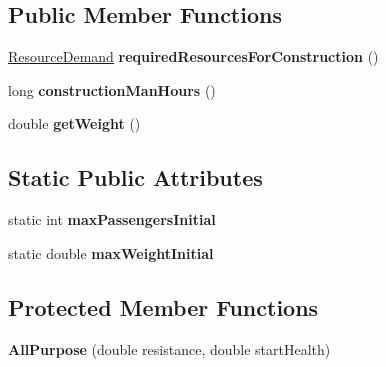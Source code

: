 \subsection*{Public Member Functions}
\begin{DoxyCompactItemize}
\item 
\hyperlink{classuniverse_1_1_resource_demand}{Resource\+Demand} {\bfseries required\+Resources\+For\+Construction} ()\hypertarget{classtools_1_1vehicles_1_1roadgoing_1_1_all_purpose_a8692e475ec5050e1d204a9bb73af242a}{}\label{classtools_1_1vehicles_1_1roadgoing_1_1_all_purpose_a8692e475ec5050e1d204a9bb73af242a}

\item 
long {\bfseries construction\+Man\+Hours} ()\hypertarget{classtools_1_1vehicles_1_1roadgoing_1_1_all_purpose_adc7e2e9735ced753b88848cc9bcf9a32}{}\label{classtools_1_1vehicles_1_1roadgoing_1_1_all_purpose_adc7e2e9735ced753b88848cc9bcf9a32}

\item 
double {\bfseries get\+Weight} ()\hypertarget{classtools_1_1vehicles_1_1roadgoing_1_1_all_purpose_a86ef04e13f32486a790e842c03ccf33f}{}\label{classtools_1_1vehicles_1_1roadgoing_1_1_all_purpose_a86ef04e13f32486a790e842c03ccf33f}

\end{DoxyCompactItemize}
\subsection*{Static Public Attributes}
\begin{DoxyCompactItemize}
\item 
static int {\bfseries max\+Passengers\+Initial}\hypertarget{classtools_1_1vehicles_1_1roadgoing_1_1_all_purpose_aa18e93512c5228b5983dcd84da7f894f}{}\label{classtools_1_1vehicles_1_1roadgoing_1_1_all_purpose_aa18e93512c5228b5983dcd84da7f894f}

\item 
static double {\bfseries max\+Weight\+Initial}\hypertarget{classtools_1_1vehicles_1_1roadgoing_1_1_all_purpose_a1c04562af5a9ab9f1b4e50e8192577ce}{}\label{classtools_1_1vehicles_1_1roadgoing_1_1_all_purpose_a1c04562af5a9ab9f1b4e50e8192577ce}

\end{DoxyCompactItemize}
\subsection*{Protected Member Functions}
\begin{DoxyCompactItemize}
\item 
{\bfseries All\+Purpose} (double resistance, double start\+Health)\hypertarget{classtools_1_1vehicles_1_1roadgoing_1_1_all_purpose_a59bf29eb6c5f3efb6e8ae017ef721b35}{}\label{classtools_1_1vehicles_1_1roadgoing_1_1_all_purpose_a59bf29eb6c5f3efb6e8ae017ef721b35}

\end{DoxyCompactItemize}
